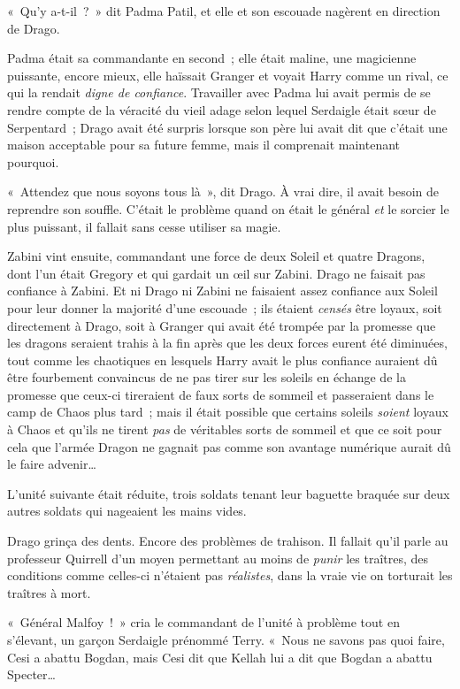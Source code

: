 «~Qu'y a-t-il~?~» dit Padma Patil, et elle et son escouade nagèrent en direction de Drago.

Padma était sa commandante en second~; elle était maline, une magicienne puissante, encore mieux, elle haïssait Granger et voyait Harry comme un rival, ce qui la rendait \emph{digne de confiance}. Travailler avec Padma lui avait permis de se rendre compte de la véracité du vieil adage selon lequel Serdaigle était sœur de Serpentard~; Drago avait été surpris lorsque son père lui avait dit que c'était une maison acceptable pour sa future femme, mais il comprenait maintenant pourquoi.

«~Attendez que nous soyons tous là~», dit Drago. À vrai dire, il avait besoin de reprendre son souffle. C'était le problème quand on était le général \emph{et} le sorcier le plus puissant, il fallait sans cesse utiliser sa magie.

Zabini vint ensuite, commandant une force de deux Soleil et quatre Dragons, dont l'un était Gregory et qui gardait un œil sur Zabini. Drago ne faisait pas confiance à Zabini. Et ni Drago ni Zabini ne faisaient assez confiance aux Soleil pour leur donner la majorité d'une escouade~; ils étaient \emph{censés} être loyaux, soit directement à Drago, soit à Granger qui avait été trompée par la promesse que les dragons seraient trahis à la fin après que les deux forces eurent été diminuées, tout comme les chaotiques en lesquels Harry avait le plus confiance auraient dû être fourbement convaincus de ne pas tirer sur les soleils en échange de la promesse que ceux-ci tireraient de faux sorts de sommeil et passeraient dans le camp de Chaos plus tard~; mais il était possible que certains soleils \emph{soient} loyaux à Chaos et qu'ils ne tirent \emph{pas} de véritables sorts de sommeil et que ce soit pour cela que l'armée Dragon ne gagnait pas comme son avantage numérique aurait dû le faire advenir…

L'unité suivante était réduite, trois soldats tenant leur baguette braquée sur deux autres soldats qui nageaient les mains vides.

Drago grinça des dents. Encore des problèmes de trahison. Il fallait qu'il parle au professeur Quirrell d'un moyen permettant au moins de \emph{punir} les traîtres, des conditions comme celles-ci n'étaient pas \emph{réalistes}, dans la vraie vie on torturait les traîtres à mort.

«~Général Malfoy~!~» cria le commandant de l'unité à problème tout en s'élevant, un garçon Serdaigle prénommé Terry. «~Nous ne savons pas quoi faire, Cesi a abattu Bogdan, mais Cesi dit que Kellah lui a dit que Bogdan a abattu Specter…

